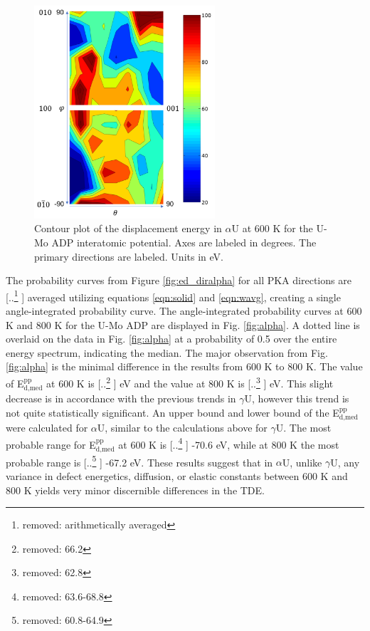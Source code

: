 \documentclass[review]{elsarticle}
\providecommand{\DIFaddtex}[1]{{\protect\color{blue} \sf #1}} %
\providecommand{\DIFdeltex}[1]{{\protect\color{red} [..\footnote{removed: #1} ]}} %
\providecommand{\DIFaddbegin}{} %
\providecommand{\DIFaddend}{} %
\providecommand{\DIFdelbegin}{} %
\providecommand{\DIFdelend}{} %
\providecommand{\DIFadd}[1]{\texorpdfstring{\DIFaddtex{#1}}{#1}} %
\providecommand{\DIFdel}[1]{\texorpdfstring{\DIFdeltex{#1}}{}} %
\newcommand{\DIFscaledelfig}{0.5}
\newlength{\DIFdelgraphicswidth} %
\newlength{\DIFdelgraphicsheight} %
\newcommand{\DIFaddincludegraphics}[2][]{{\color{blue}\fbox{\DIFOincludegraphics[#1]{#2}}}} %
\newcommand{\DIFdelincludegraphics}[2][]{%
\sbox{\DIFdelgraphicsbox}{\DIFOincludegraphics[#1]{#2}}%
\settoboxwidth{\DIFdelgraphicswidth}{\DIFdelgraphicsbox} %
\settoboxtotalheight{\DIFdelgraphicsheight}{\DIFdelgraphicsbox} %
\scalebox{\DIFscaledelfig}{%
\parbox[b]{\DIFdelgraphicswidth}{\usebox{\DIFdelgraphicsbox}\\[-\baselineskip] \rule{\DIFdelgraphicswidth}{0em}}\llap{\resizebox{\DIFdelgraphicswidth}{\DIFdelgraphicsheight}{%
\setlength{\unitlength}{\DIFdelgraphicswidth}%
\begin{picture}(1,1)%
\thicklines\linethickness{2pt} %
{\color[rgb]{1,0,0}\put(0,0){\framebox(1,1){}}}%
{\color[rgb]{1,0,0}\put(0,0){\line( 1,1){1}}}%
{\color[rgb]{1,0,0}\put(0,1){\line(1,-1){1}}}%
\end{picture}%
}\hspace*{3pt}}} %
} %
\DeclareRobustCommand{\DIFaddbegin}{\DIFOaddbegin \let\includegraphics\DIFaddincludegraphics} %
\DeclareRobustCommand{\DIFaddend}{\DIFOaddend \let\includegraphics\DIFOincludegraphics} %
\DeclareRobustCommand{\DIFdelbegin}{\DIFOdelbegin \let\includegraphics\DIFdelincludegraphics} %
\DeclareRobustCommand{\DIFdelend}{\DIFOaddend \let\includegraphics\DIFOincludegraphics} %
\begin{document}
\begin{figure}[h]
 \centering
 \includegraphics[width=0.6\textwidth]{600K_contourA.png} 
 \caption{Contour plot of the displacement energy in $\alpha$U at 600 K for the U-Mo ADP interatomic potential. Axes are labeled in degrees. The primary directions are labeled. Units in eV.}
 \label{fig:600Kcontour}
\end{figure}

\FloatBarrier

The probability curves from Figure \ref{fig:ed_diralpha} for all PKA directions are \DIFdelbegin \DIFdel{arithmetically averaged }\DIFdelend \DIFaddbegin \DIFadd{averaged utilizing equations \ref{eqn:solid} and \ref{eqn:wavg}}\DIFaddend , creating a single angle-integrated probability curve. The angle-integrated probability curves at 600 K and 800 K for the U-Mo ADP are displayed in Fig. \ref{fig:alpha}. A dotted line is overlaid on the data in Fig. \ref{fig:alpha} at a probability of 0.5 over the entire energy spectrum, indicating the median. The major observation from Fig. \ref{fig:alpha} is the minimal difference in the results from 600 K to 800 K. The value of E$^{\textrm{pp}}_{\textrm{d,med}}$ at 600 K is \DIFdelbegin \DIFdel{66.2 }\DIFdelend \DIFaddbegin \DIFadd{66.3 }\DIFaddend eV and the value at 800 K is \DIFdelbegin \DIFdel{62.8 }\DIFdelend \DIFaddbegin \DIFadd{63.4 }\DIFaddend eV. This slight decrease is in accordance with the previous trends in $\gamma$U, however this trend is not quite statistically significant. An upper bound and lower bound of the E$^{\textrm{pp}}_{\textrm{d,med}}$ were calculated for $\alpha$U, similar to the calculations above for $\gamma$U. The most probable range for E$^{\textrm{pp}}_{\textrm{d,med}}$ at 600 K is \DIFdelbegin \DIFdel{63.6-68.8 }\DIFdelend \DIFaddbegin \DIFadd{62.3-70.6 }\DIFaddend eV, while at 800 K the most probable range is \DIFdelbegin \DIFdel{60.8-64.9 }\DIFdelend \DIFaddbegin \DIFadd{60.0-67.2 }\DIFaddend eV. These results suggest that in $\alpha$U, unlike $\gamma$U, any variance in defect energetics, diffusion, or elastic constants between 600 K and 800 K yields very minor discernible differences in the TDE.
\end{document}
